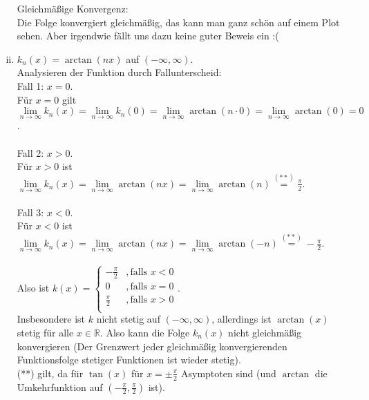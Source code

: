 \documentclass[11pt,a4paper,ngerman]{article}
\newcommand{\limes}[2][n]{\underset{ #1 \rightarrow #2}{\lim}}
\begin{document}
\begin{enumerate}[(i)]
        Gleichmäßige Konvergenz: \\
        Die Folge konvergiert gleichmäßig, das kann man ganz schön auf einem Plot sehen. Aber irgendwie fällt uns dazu keine guter Beweis ein :(
        \\
    \item $k_n(x) = \arctan(nx)$ auf $(-\infty, \infty)$.\\
        Analysieren der Funktion durch Fallunterscheid: \\
        Fall 1: $x = 0$. \\
        Für $x=0$ gilt $\limes{\infty} k_n(x) = \limes{\infty} k_n(0) = \limes{\infty} \arctan(n \cdot 0) = \limes{\infty} \arctan(0) = 0$. \\ \\
        Fall 2: $x > 0$. \\
        Für $x>0$ ist $\limes{\infty} k_n(x) = \limes{\infty} \arctan(nx) = \limes{\infty} \arctan(n) \stackrel{(**)}{=} \frac{\pi}{2}$. \\ \\
        Fall 3: $x < 0$. \\
        Für $x<0$ ist $\limes{\infty} k_n(x) = \limes{\infty} \arctan(nx) = \limes{\infty} \arctan(-n) \stackrel{(**)}{=} -\frac{\pi}{2}$. \\ \\
    
        Also ist $k(x) = \begin{cases}
                              -\frac{\pi}{2} &, \text{falls } x < 0 \\
                              0 &, \text{falls } x = 0 \\
                              \frac{\pi}{2} &, \text{falls } x > 0 \\
                          \end{cases}$. \\
        
        Insbesondere ist $k$ nicht stetig auf $(-\infty, \infty)$, allerdings ist $\arctan(x)$ stetig für alle $x \in \mathbb{R}$. Also  kann die Folge $k_n(x)$ nicht gleichmäßig konvergieren (Der Grenzwert jeder gleichmäßig konvergierenden Funktionsfolge stetiger Funktionen ist wieder stetig). \\

      (**) gilt, da für $\tan(x)$ für $x = \pm \frac{\pi}{2}$ Asymptoten sind (und $\arctan$ die Umkehrfunktion auf $(-\frac{\pi}{2},\frac{\pi}{2})$ ist).
\end{enumerate}
\end{document}
